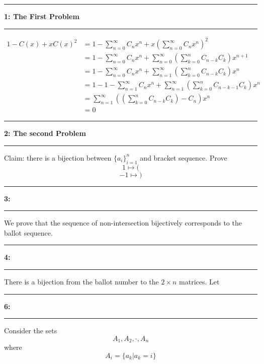 \documentclass[11pt]{article}
\newcommand\question[2]{\vspace{.25in}\hrule\textbf{#1: #2}\vspace{.5em}\hrule\vspace{.10in}}
\begin{document}
\raggedright
\newcommand\NAME{Carl Kingsford}  %
\newcommand\ANDREWID{ckingsf}     %
\newcommand\HWNUM{1}              %
\newcommand\suminf{\sum_{n=0}^{\infty}}


\question{1}{The First Problem}
\begin{align*}
    1-C(x) + xC(x)^2 &= 1 - \sum_{n=0}^{\infty}C_nx^{n} + x\left(\sum_{n=0}^{\infty}C_nx^{n}\right)^2\\
                     &= 1 - \suminf C_nx^{n} + \suminf \left(\sum_{k=0}^{n} C_{n-k}C_k\right) x^{n + 1} \\
                     &= 1 - \suminf C_nx^{n} + \sum_{n=1}^{\infty} \left(\sum_{k=0}^{n} C_{n-k}C_k\right) x^{n} \\
                     &= 1 - 1 - \sum_{n=1}^{\infty} C_nx^{n} + \sum_{n=1}^{\infty} \left(\sum_{k=0}^{n} C_{n-k - 1}C_k\right) x^{n} \\
                     &= \sum_{n=1}^{\infty} \left( \left(\sum_{k=0}^{n} C_{n-k}C_k\right) - C_{n}\right)x^{n}\\
                     &= 0
\end{align*}
\question{2}{The second Problem}
Claim: there is a bijection between $\{a_i\}_{i=1}^{n}$ and bracket sequence.
Prove 
\[ 1 \mapsto ( \]
\[-1 \mapsto ) \]
\question{3}{}
We prove that the sequence of non-intersection bijectively corresponds to the ballot sequence.


\question{4}{}
There is a bijection from the ballot number to the $2\times n$ matrices.
Let 
\[\]
\question{6}{}
Consider the sets
\[A_1, A_2, \cdot, A_n\]
where \[A_i = \{a_k| a_k = i\}\]
\end{document}
